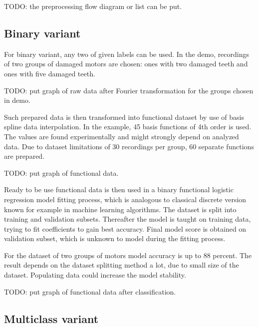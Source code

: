 \documentclass[energies,article,submit,pdftex,moreauthors]{Definitions/mdpi}
\begin{document}
\vspace{5mm}
TODO: the preprocessing flow diagram or list can be put.
\vspace{5mm}

\subsection{Binary variant}

For binary variant, any two of given labels can be used. In the demo, recordings of two groups of damaged motors are chosen: ones with two damaged teeth and ones with five damaged teeth. 

\vspace{5mm}
TODO: put graph of raw data after Fourier transformation for the groups chosen in demo.
\vspace{5mm}

Such prepared data is then transformed into functional dataset by use of basis spline data interpolation. In the example, 45 basis functions of 4th order is used. The values are found experimentally and might strongly depend on analyzed data. Due to dataset limitations of 30 recordings per group, 60 separate functions are prepared.

\vspace{5mm}
TODO: put graph of functional data.
\vspace{5mm}

Ready to be use functional data is then used in a binary functional logistic regression model fitting process, which is analogous to classical discrete version known for example in machine learning algorithms. The dataset is split into training and validation subsets. Thereafter the model is taught on training data, trying to fit coefficients to gain best accuracy. Final model score is obtained on validation subset, which is unknown to model during the fitting process.

For the dataset of two groups of motors model accuracy is up to 88 percent. The result depends on the dataset splitting method a lot, due to small size of the dataset. Populating data could increase the model stability. 

\vspace{5mm}
TODO: put graph of functional data after classification.
\vspace{5mm}

\subsection{Multiclass variant}
\end{document}
